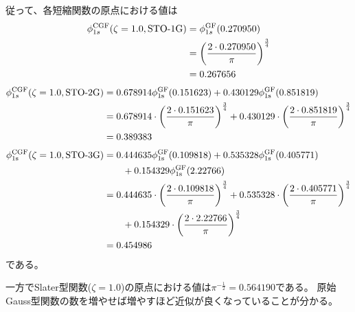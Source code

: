 従って、各短縮関数の原点における値は
\begin{align}
	\phi^{\rm CGF}_{1s}(\zeta=1.0,\text{STO-1G})
&=
	\phi^{\rm GF}_{1s}(0.270950) \\
%
%
&=
	\left(
		\frac{2\cdot 0.270950}{\pi}
	\right)^{\frac{3}{4}} \\
%
%
&=
	0.267656
\end{align}
\begin{align}
	\phi^{\rm CGF}_{1s}(\zeta=1.0,\text{STO-2G})
&=
	0.678914
	\phi^{\rm GF}_{\rm 1s}(0.151623)
	+
	0.430129
	\phi^{\rm GF}_{\rm 1s}(0.851819) \\
%
%
&=
	0.678914\cdot
	\left(
		\frac{2\cdot 0.151623}{\pi}
	\right)^{\frac{3}{4}}
	+
	0.430129\cdot
	\left(
		\frac{2\cdot 0.851819}{\pi}
	\right)^{\frac{3}{4}} \\
%
%
&=
	0.389383
\end{align}
\begin{align}
	\phi^{\rm CGF}_{\rm 1s}(\zeta=1.0,\text{STO-3G})
&=
	0.444635
	\phi^{\rm GF}_{\rm 1s}(0.109818)
	+
	0.535328
	\phi^{\rm GF}_{\rm 1s}(0.405771) \\ &\qquad
	+
	0.154329
	\phi^{\rm GF}_{\rm 1s}(2.22766) \\
%
%
&=
	0.444635\cdot
	\left(
		\frac{2\cdot 0.109818}{\pi}
	\right)^{\frac{3}{4}}
	+
	0.535328\cdot
	\left(
		\frac{2\cdot 0.405771}{\pi}
	\right)^{\frac{3}{4}} \\ &\qquad
	+
	0.154329\cdot
	\left(
		\frac{2\cdot 2.22766}{\pi}
	\right)^{\frac{3}{4}} \\
%
%
&=
	0.454986
\end{align}
である。

一方でSlater型関数($\zeta=1.0$)の原点における値は$\pi^{-\frac{1}{2}}=0.564190$である。
原始Gauss型関数の数を増やせば増やすほど近似が良くなっていることが分かる。
